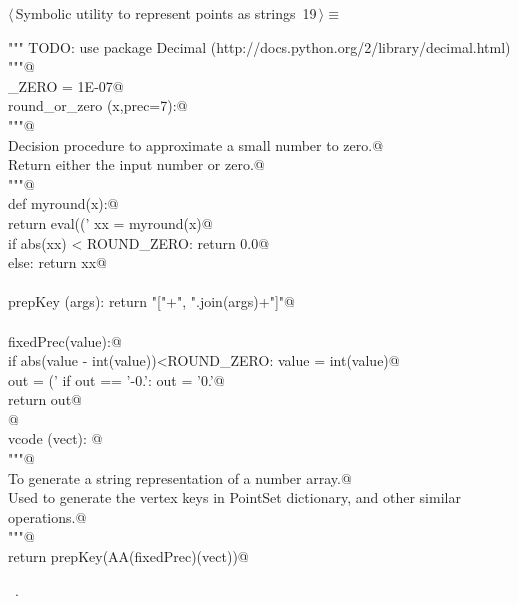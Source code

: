 \documentclass[11pt,oneside]{article}	%
\begin{document}
\begin{flushleft} \small \label{scrap49}
\protect{}$\langle\,$Symbolic utility to represent points as strings\nobreak\ {\footnotesize 19}$\,\rangle\equiv$
\vspace{-1ex}
\begin{list}{}{} \item
\mbox{}\verb@""" TODO: use package Decimal (http://docs.python.org/2/library/decimal.html) """@\\
\mbox{}\verb@ROUND_ZERO = 1E-07@\\
\mbox{}\verb@def round_or_zero (x,prec=7):@\\
\mbox{}\verb@   """@\\
\mbox{}\verb@   Decision procedure to approximate a small number to zero.@\\
\mbox{}\verb@   Return either the input number or zero.@\\
\mbox{}\verb@   """@\\
\mbox{}\verb@   def myround(x):@\\
\mbox{}\verb@      return eval(('%.'+str(prec)+'f') % round(x,prec))@\\
\mbox{}\verb@   xx = myround(x)@\\
\mbox{}\verb@   if abs(xx) < ROUND_ZERO: return 0.0@\\
\mbox{}\verb@   else: return xx@\\
\mbox{}\verb@@\\
\mbox{}\verb@def prepKey (args): return "["+", ".join(args)+"]"@\\
\mbox{}\verb@@\\
\mbox{}\verb@def fixedPrec(value):@\\
\mbox{}\verb@   if abs(value - int(value))<ROUND_ZERO: value = int(value)@\\
\mbox{}\verb@   out = ('%0.7f'% value).rstrip('0')@\\
\mbox{}\verb@   if out == '-0.': out = '0.'@\\
\mbox{}\verb@   return out@\\
\mbox{}\verb@   @\\
\mbox{}\verb@def vcode (vect): @\\
\mbox{}\verb@   """@\\
\mbox{}\verb@   To generate a string representation of a number array.@\\
\mbox{}\verb@   Used to generate the vertex keys in PointSet dictionary, and other similar operations.@\\
\mbox{}\verb@   """@\\
\mbox{}\verb@   return prepKey(AA(fixedPrec)(vect))@\\
\mbox{}\verb@@{\NWsep}
\end{list}
\vspace{-1ex}
\footnotesize\addtolength{\baselineskip}{-1ex}
\begin{list}{}{\setlength{\itemsep}{-\parsep}\setlength{\itemindent}{-\leftmargin}}
\item \NWtxtMacroRefIn\ .
\end{list}
\end{flushleft}






\end{document}
